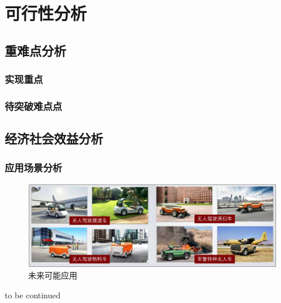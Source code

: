 \newpage

\section{可行性分析}

\subsection{重难点分析}

\subsubsection{实现重点}

\subsubsection{待突破难点点}

\subsection{经济社会效益分析}

\subsubsection{应用场景分析}

\begin{figure}[htbp]
	\centering
	\includegraphics[width = 1\textwidth]{fig/wlknyy.png}
	\caption{未来可能应用}
	\label{wlknyy}
\end{figure}

to be continued